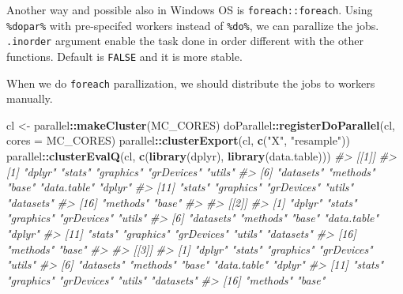 \documentclass[]{book}
\newenvironment{Shaded}{\begin{snugshade}}{\end{snugshade}}
\newcommand{\CommentTok}[1]{\textcolor[rgb]{0.56,0.35,0.01}{\textit{#1}}}
\newcommand{\DataTypeTok}[1]{\textcolor[rgb]{0.13,0.29,0.53}{#1}}
\newcommand{\DecValTok}[1]{\textcolor[rgb]{0.00,0.00,0.81}{#1}}
\newcommand{\KeywordTok}[1]{\textcolor[rgb]{0.13,0.29,0.53}{\textbf{#1}}}
\newcommand{\NormalTok}[1]{#1}
\newcommand{\OperatorTok}[1]{\textcolor[rgb]{0.81,0.36,0.00}{\textbf{#1}}}
\newcommand{\OtherTok}[1]{\textcolor[rgb]{0.56,0.35,0.01}{#1}}
\newcommand{\StringTok}[1]{\textcolor[rgb]{0.31,0.60,0.02}{#1}}
\theoremstyle{definition}
\theoremstyle{definition}
\theoremstyle{definition}
\theoremstyle{remark}
\begin{document}
Another way and possible also in Windows OS is \texttt{foreach::foreach}. Using \texttt{\%dopar\%} with pre-specifed workers instead of \texttt{\%do\%}, we can parallize the jobs. \texttt{.inorder} argument enable the task done in order different with the other functions. Default is \texttt{FALSE} and it is more stable.

When we do \texttt{foreach} parallization, we should distribute the jobs to workers manually.

\begin{Shaded}
\begin{Highlighting}[]
\NormalTok{cl <-}\StringTok{ }\NormalTok{parallel}\OperatorTok{::}\KeywordTok{makeCluster}\NormalTok{(MC_CORES)}
\NormalTok{doParallel}\OperatorTok{::}\KeywordTok{registerDoParallel}\NormalTok{(cl, }\DataTypeTok{cores =}\NormalTok{ MC_CORES)}
\NormalTok{parallel}\OperatorTok{::}\KeywordTok{clusterExport}\NormalTok{(cl, }\KeywordTok{c}\NormalTok{(}\StringTok{"X"}\NormalTok{, }\StringTok{"resample"}\NormalTok{))}
\NormalTok{parallel}\OperatorTok{::}\KeywordTok{clusterEvalQ}\NormalTok{(cl, }\KeywordTok{c}\NormalTok{(}\KeywordTok{library}\NormalTok{(dplyr), }\KeywordTok{library}\NormalTok{(data.table)))}
\CommentTok{#> [[1]]}
\CommentTok{#>  [1] "dplyr"      "stats"      "graphics"   "grDevices"  "utils"     }
\CommentTok{#>  [6] "datasets"   "methods"    "base"       "data.table" "dplyr"     }
\CommentTok{#> [11] "stats"      "graphics"   "grDevices"  "utils"      "datasets"  }
\CommentTok{#> [16] "methods"    "base"      }
\CommentTok{#> }
\CommentTok{#> [[2]]}
\CommentTok{#>  [1] "dplyr"      "stats"      "graphics"   "grDevices"  "utils"     }
\CommentTok{#>  [6] "datasets"   "methods"    "base"       "data.table" "dplyr"     }
\CommentTok{#> [11] "stats"      "graphics"   "grDevices"  "utils"      "datasets"  }
\CommentTok{#> [16] "methods"    "base"      }
\CommentTok{#> }
\CommentTok{#> [[3]]}
\CommentTok{#>  [1] "dplyr"      "stats"      "graphics"   "grDevices"  "utils"     }
\CommentTok{#>  [6] "datasets"   "methods"    "base"       "data.table" "dplyr"     }
\CommentTok{#> [11] "stats"      "graphics"   "grDevices"  "utils"      "datasets"  }
\CommentTok{#> [16] "methods"    "base"}
\end{Highlighting}
\end{Shaded}

\begin{Shaded}
\end{Shaded}
\end{document}
